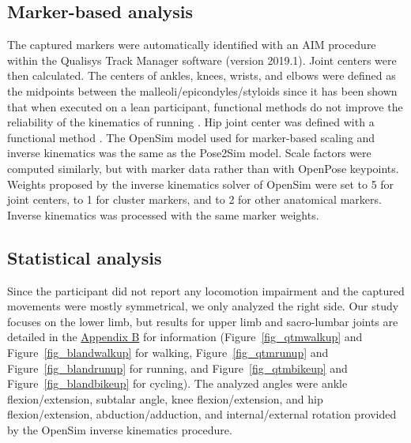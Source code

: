 \subsection{Marker-based analysis}

The captured markers were automatically identified with an AIM procedure within the Qualisys Track Manager software (version 2019.1). Joint centers were then calculated. The centers of ankles, knees, wrists, and elbows were defined as the midpoints between the malleoli/epicondyles/styloids since it has been shown that when executed on a lean participant, functional methods do not improve the reliability of the kinematics of running \cite{Pohl2010}. Hip joint center was defined with a functional method \cite{Halvorsen2003}. The OpenSim model used for marker-based scaling and inverse kinematics was the same as the Pose2Sim model. Scale factors were computed similarly, but with marker data rather than with OpenPose keypoints. Weights proposed by the inverse kinematics solver of OpenSim were set to 5 for joint centers, to 1 for cluster markers, and to 2 for other anatomical markers. Inverse kinematics was processed with the same marker weights.


\subsection{Statistical analysis}

Since the participant did not report any locomotion impairment and the captured movements were mostly symmetrical, we only analyzed the right side. Our study focuses on the lower limb, but results for upper limb and sacro-lumbar joints are detailed in the \hyperref[Ann:2]{Appendix B} for information (Figure~\ref{fig_qtmwalkup} and Figure~\ref{fig_blandwalkup} for walking, Figure~\ref{fig_qtmrunup} and Figure~\ref{fig_blandrunup} for running, and Figure~\ref{fig_qtmbikeup} and Figure~\ref{fig_blandbikeup} for cycling). The analyzed angles were ankle flexion/extension, subtalar angle, knee flexion/extension, and hip flexion/extension, abduction/adduction, and internal/external rotation provided by the OpenSim inverse kinematics procedure.

